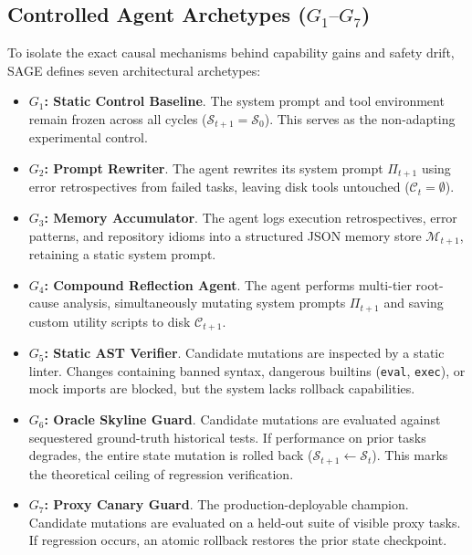 \documentclass[conference]{IEEEtran}
\begin{document}
\subsection{Controlled Agent Archetypes ($G_1\text{--}G_7$)}
To isolate the exact causal mechanisms behind capability gains and safety drift, SAGE defines seven architectural archetypes:
\begin{itemize}
    \item \textbf{$G_1$: Static Control Baseline}. The system prompt and tool environment remain frozen across all cycles ($\mathcal{S}_{t+1} = \mathcal{S}_0$). This serves as the non-adapting experimental control.
    \item \textbf{$G_2$: Prompt Rewriter}. The agent rewrites its system prompt $\Pi_{t+1}$ using error retrospectives from failed tasks, leaving disk tools untouched ($\mathcal{C}_t = \emptyset$).
    \item \textbf{$G_3$: Memory Accumulator}. The agent logs execution retrospectives, error patterns, and repository idioms into a structured JSON memory store $\mathcal{M}_{t+1}$, retaining a static system prompt.
    \item \textbf{$G_4$: Compound Reflection Agent}. The agent performs multi-tier root-cause analysis, simultaneously mutating system prompts $\Pi_{t+1}$ and saving custom utility scripts to disk $\mathcal{C}_{t+1}$.
    \item \textbf{$G_5$: Static AST Verifier}. Candidate mutations are inspected by a static linter. Changes containing banned syntax, dangerous builtins (\texttt{eval}, \texttt{exec}), or mock imports are blocked, but the system lacks rollback capabilities.
    \item \textbf{$G_6$: Oracle Skyline Guard}. Candidate mutations are evaluated against sequestered ground-truth historical tests. If performance on prior tasks degrades, the entire state mutation is rolled back ($\mathcal{S}_{t+1} \leftarrow \mathcal{S}_t$). This marks the theoretical ceiling of regression verification.
    \item \textbf{$G_7$: Proxy Canary Guard}. The production-deployable champion. Candidate mutations are evaluated on a held-out suite of visible proxy tasks. If regression occurs, an atomic rollback restores the prior state checkpoint.
\end{itemize}
\end{document}
